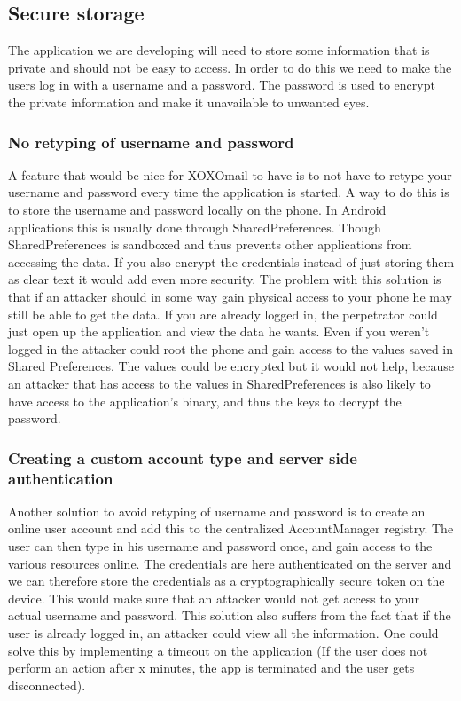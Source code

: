 \subsection{Secure storage}
The application we are developing will need to store some information that is private and should not be easy to access. In order to do this we need to make the users log in with a username and a password. The password is used to encrypt the private information and make it unavailable to unwanted eyes.  

\subsubsection{No retyping of username and password}
A feature that would be nice for XOXOmail to have is to not have to retype your username and password every time the application is started.
\newline
\newline
A way to do this is to store the username and password locally on the phone. In Android applications this is usually done through SharedPreferences. Though SharedPreferences is sandboxed and thus prevents other applications from accessing the data. If you also encrypt the credentials instead of just storing them as clear text it would add even more security.
\newline
\newline
The problem with this solution is that if an attacker should in some way gain physical access to your phone he may still be able to get the data. If you are already logged in, the perpetrator could just open up the application and view the data he wants. Even if you weren’t logged in the attacker could root the phone and gain access to the values saved in Shared Preferences. The values could be encrypted but it would not help, because an attacker that has access to the values in SharedPreferences is also likely to have access to the application’s binary, and thus the keys to decrypt the password.


\subsubsection{Creating a custom account type and server side authentication}
Another solution to avoid retyping of username and password is to create an online user account and add this to the centralized AccountManager registry. The user can then type in his username and password once, and gain access to the various resources online. The credentials are here authenticated on the server and we can therefore store the credentials as a cryptographically secure token on the device. This would make sure that an attacker would not get access to your actual username and password.
\newline
\newline
This solution also suffers from the fact that if the user is already logged in, an attacker could view all the information. One could solve this by implementing a timeout on the application (If the user does not perform an action after x minutes, the app is terminated and the user gets disconnected).

